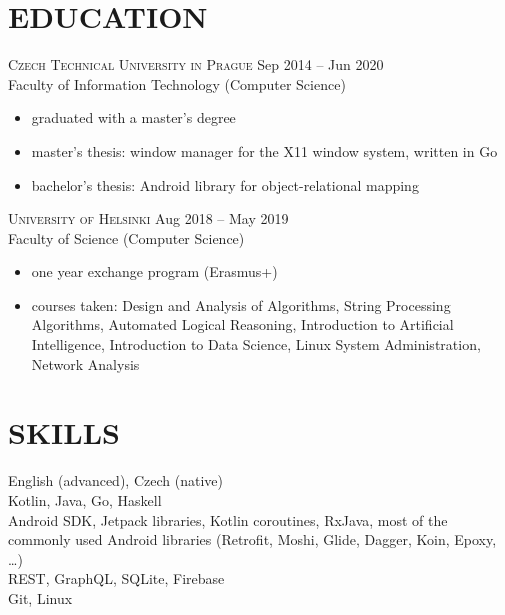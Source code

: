 \documentclass[margin]{res}
\begin{document}
\begin{resume}
        \section{EDUCATION}
        \textsc{Czech Technical University in Prague} \hfill Sep 2014 -- Jun 2020\\
        Faculty of Information Technology (Computer Science)
        \vspace{2mm}
        \begin{itemize}
            \item graduated with a master's degree
            \item master's thesis: window manager for the X11 window system, written in Go
            \item bachelor's thesis: Android library for object-relational mapping
        \end{itemize}

        \vspace{5mm}

        \textsc{University of Helsinki} \hfill Aug 2018 -- May 2019\\
        Faculty of Science (Computer Science)
        \vspace{2mm}
        \begin{itemize}
            \item one year exchange program (Erasmus+)
            \item courses taken: Design and Analysis of Algorithms, String Processing Algorithms, Automated Logical Reasoning, Introduction to Artificial Intelligence, Introduction to Data Science, Linux System Administration, Network Analysis
        \end{itemize}

        \onehalfspacing
        \section{SKILLS}
        English (advanced), Czech (native)\\
        Kotlin, Java, Go, Haskell \\
        Android SDK, Jetpack libraries, Kotlin coroutines, RxJava, most of the commonly used
        Android libraries (Retrofit, Moshi, Glide, Dagger, Koin, Epoxy, \ldots) \\
        REST, GraphQL, SQLite, Firebase \\
        Git, Linux

    \end{resume}
\end{document}
